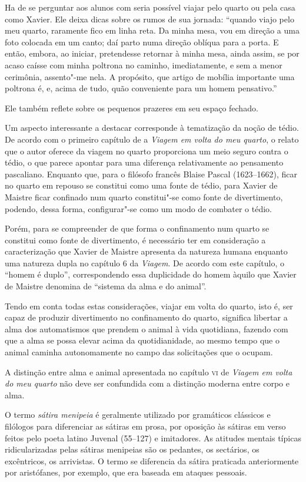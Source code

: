 \documentclass[12pt]{extarticle}
\begin{document}
Ha de se perguntar aos alunos com seria possível viajar pelo quarto ou pela casa como Xavier. 
Ele deixa dicas sobre os rumos de sua jornada: ``quando viajo pelo meu quarto, 
raramente fico em linha reta. Da minha mesa, vou em direção a uma foto colocada 
em um canto; daí parto numa direção oblíqua para a porta.
E então, embora, ao iniciar, pretendesse retornar à minha mesa, ainda assim, se por acaso caísse com minha poltrona no caminho, imediatamente, e sem a menor cerimônia, assento"-me nela. A propósito, que artigo de mobília importante uma poltrona é, e, acima de tudo, quão conveniente para um homem pensativo.''

Ele também reflete sobre os pequenos prazeres em seu espaço fechado.

Um aspecto interessante a destacar corresponde à tematização da noção de tédio. De acordo com o primeiro capítulo de a \textit{Viagem em volta do meu quarto}, o relato que o autor oferece da viagem no quarto proporciona um meio seguro contra o tédio, o que parece apontar para uma diferença relativamente ao pensamento pascaliano. Enquanto que, para o filósofo francês Blaise Pascal (1623--1662), ficar no quarto em repouso se constitui como uma fonte de tédio, para Xavier de Maistre ficar confinado num quarto constitui"-se como fonte de divertimento, 
podendo, dessa forma, configurar"-se como um modo de combater o tédio. 

Porém, para se compreender de que forma o confinamento num quarto se constitui como fonte de divertimento, é necessário ter em consideração a caracterização que Xavier de Maistre apresenta da natureza humana enquanto uma natureza dupla no capítulo 6 da \textit{Viagem}. De acordo com este capítulo, o ``homem é duplo'', correspondendo essa duplicidade do homem àquilo que Xavier de Maistre denomina de ``sistema da alma e do animal''. 

Tendo em conta todas estas considerações, viajar em volta do quarto, isto é, ser capaz de produzir divertimento no confinamento do quarto, significa libertar a alma dos
automatismos que prendem o animal à vida quotidiana, fazendo com que a alma se
possa elevar acima da quotidianidade, ao mesmo tempo que o animal caminha autonomamente no campo das solicitações que o ocupam.

A distinção entre alma e animal apresentada no capítulo \textsc{vi} de \textit{Viagem em volta do meu quarto} 
não deve ser confundida com a distinção moderna entre corpo e alma. 

O termo \textit{sátira menipeia} é geralmente utilizado por gramáticos clássicos e filólogos 
para diferenciar as sátiras em prosa, por oposição às sátiras em verso feitos pelo poeta 
latino Juvenal (55--127) e imitadores. As atitudes mentais típicas ridicularizadas pelas sátiras menipeias são os pedantes, os sectários, os excêntricos, os arrivistas. O termo se diferencia da sátira praticada anteriormente por aristófanes, por exemplo, que era baseada em ataques pessoais. 
\end{document}
